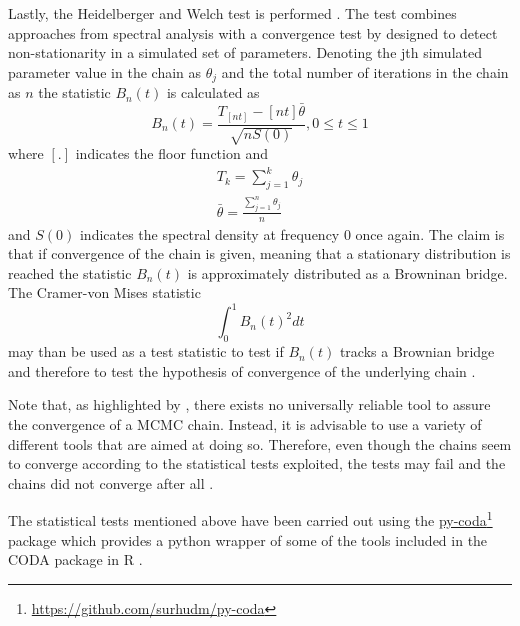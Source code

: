 \documentclass[a4paper,fleqn,usenatbib]{mnras}
\newcommand\fnurl[2]{%
  \href{#2}{#1}\footnote{\url{#2}}%
}
\begin{document}
Lastly, the Heidelberger and Welch test is performed \citep{heidelberger1983simulation}. The test combines approaches from spectral analysis with a convergence test by \citet{schruben1983optimal} designed to detect non-stationarity in a simulated set of parameters. Denoting the jth simulated parameter value in the chain as $\theta_j$ and the total number of iterations in the chain as $n$ the statistic $B_n(t)$ is calculated as
\begin{equation}
B_n(t)=\frac{T_{[nt]}-[nt]\bar{\theta}}{\sqrt{nS(0)}} , 0 \leq t \leq 1
\end{equation}
where $[.]$ indicates the floor function and
\begin{align}
T_k=\sum_{j=1}^k \theta_j \\
\bar{\theta}=\frac{\sum_{j=1}^n \theta_j}{n}
\end{align}
and $S(0)$ indicates the spectral density at frequency 0 once again. The claim is that if convergence of the chain is given, meaning that a stationary distribution is reached the statistic $B_n(t)$ is approximately distributed as a Browninan bridge. The Cramer-von Mises statistic 
\begin{equation}
\int_0^1 B_n(t)^2 dt
\end{equation}
may than be used as a test statistic to test if $B_n(t)$ tracks a Brownian bridge and therefore to test the hypothesis of convergence of the underlying chain \citep{cowles1996markov}.

Note that, as highlighted by \citet{cowles1996markov}, there exists no universally reliable tool to assure the convergence of a MCMC chain. Instead, it is advisable to use a variety of different tools that are aimed at doing so. Therefore, even though the chains seem to converge according to the statistical tests exploited, the tests may fail and the chains did not converge after all \citep{cowles1996markov}.

The statistical tests mentioned above have been carried out using the \fnurl{py-coda}{https://github.com/surhudm/py-coda} package which provides a python wrapper of some of the tools included in the CODA package in R \citep{coda}. 
\end{document}
